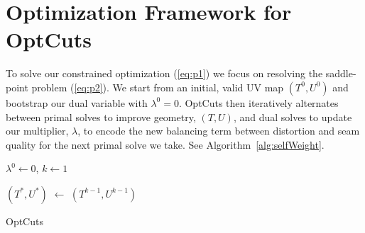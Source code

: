 
\section{Optimization Framework for OptCuts}

To solve our constrained optimization (\ref{eq:p1}) we focus on resolving the saddle-point problem (\ref{eq:p2}). 
We start from an initial, valid UV map $(T^0, U^0)$ and bootstrap our dual variable with $\lambda^0 = 0$. OptCuts then iteratively alternates between primal solves to improve geometry, $(T, U)$, and dual solves to update our multiplier, $\lambda$, to encode the new balancing term between distortion and seam quality for the next primal solve we take. See Algorithm~\ref{alg:selfWeight}.

\begin{algorithm}[!h]
\SetAlgoLined
{}

$\lambda^0 \leftarrow 0$, $k \leftarrow 1$\;

$(T^*, U^*)$ $ \leftarrow$ $(T^{k-1}, U^{k-1})$\; 

\caption{OptCuts}
\label{alg:selfWeight}
\end{algorithm}

%
%


